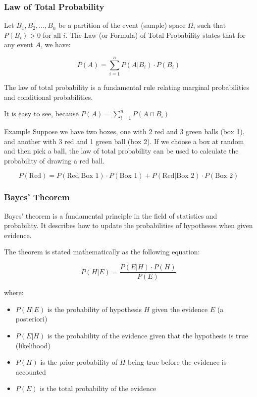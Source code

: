 \documentclass[fullscreen=true, bookmarks=true, hyperref={pdfencoding=unicode}]{beamer}
\begin{document}
\begin{frame}
  \frametitle{Law of Total Probability}

  \pause
  Let $B_1, B_2, \ldots, B_n$ be a partition of the event (sample) 
  space $\Omega$, such that $P(B_i) > 0$ for all $i$. 
  The Law (or Formula) of Total Probability states that for any event $A$, we have:
  
  \[
  P(A) = \sum_{i=1}^{n} P(A | B_i) \cdot P(B_i)
  \]

  \pause
  The law of total probability is a fundamental rule relating 
  marginal probabilities and conditional probabilities. 

  It is easy to see, because $P(A) = \sum\limits_{i=1}^{n} P(A \cap B_i)$

  \pause
  \begin{block}{Example}
    \scriptsize
    Suppose we have two boxes, one with 2 red and 3 green balls (box 1), and another with 3 red and 1 green ball (box 2). If we choose a box at random and then pick a ball, the law of total probability can be used to calculate the probability of drawing a red ball.
    
    \[
    P(\text{{Red}}) = P(\text{{Red}} | \text{{Box 1}}) \cdot P(\text{{Box 1}}) + P(\text{{Red}} | \text{{Box 2}}) \cdot P(\text{{Box 2}})
    \]
  \end{block}
\end{frame}


\begin{frame}
  \frametitle{Bayes' Theorem}

  \pause
  Bayes' theorem is a fundamental principle in the field of statistics and probability. It describes how to update the probabilities of hypotheses when given evidence.

  The theorem is stated mathematically as the following equation:
  
  \[
  P(H|E) = \frac{P(E|H) \cdot P(H)}{P(E)}
  \]

  where:
  \begin{itemize}
    \pause\item $P(H|E)$ is the probability of hypothesis $H$ given 
    the evidence $E$ (a posteriori)
    \pause\item $P(E|H)$ is the probability of the evidence given 
    that the hypothesis is true (likelihood)
    \pause\item $P(H)$ is the prior probability of $H$ being true before the evidence is accounted
    \pause\item $P(E)$ is the total probability of the evidence
  \end{itemize}
\end{frame}
\end{document}
